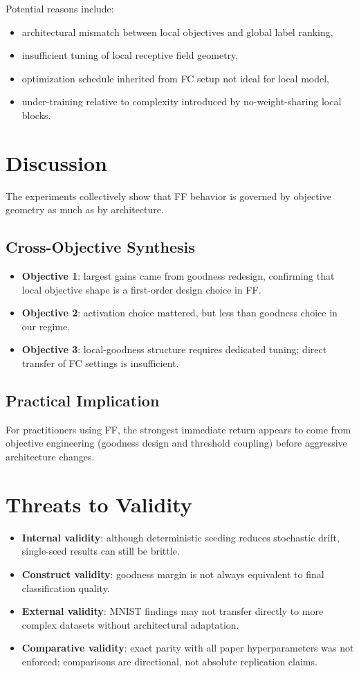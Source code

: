 \documentclass[sigconf]{acmart}
\begin{document}
Potential reasons include:
\begin{itemize}
  \item architectural mismatch between local objectives and global label ranking,
  \item insufficient tuning of local receptive field geometry,
  \item optimization schedule inherited from FC setup not ideal for local model,
  \item under-training relative to complexity introduced by no-weight-sharing local blocks.
\end{itemize}

\section{Discussion}
The experiments collectively show that FF behavior is governed by objective geometry as much as by architecture.

\subsection{Cross-Objective Synthesis}
\begin{itemize}
  \item \textbf{Objective 1}: largest gains came from goodness redesign, confirming that local objective shape is a first-order design choice in FF.
  \item \textbf{Objective 2}: activation choice mattered, but less than goodness choice in our regime.
  \item \textbf{Objective 3}: local-goodness structure requires dedicated tuning; direct transfer of FC settings is insufficient.
\end{itemize}

\subsection{Practical Implication}
For practitioners using FF, the strongest immediate return appears to come from objective engineering (goodness design and threshold coupling) before aggressive architecture changes.

\section{Threats to Validity}
\begin{itemize}
  \item \textbf{Internal validity}: although deterministic seeding reduces stochastic drift, single-seed results can still be brittle.
  \item \textbf{Construct validity}: goodness margin is not always equivalent to final classification quality.
  \item \textbf{External validity}: MNIST findings may not transfer directly to more complex datasets without architectural adaptation.
  \item \textbf{Comparative validity}: exact parity with all paper hyperparameters was not enforced; comparisons are directional, not absolute replication claims.
\end{itemize}
\end{document}
